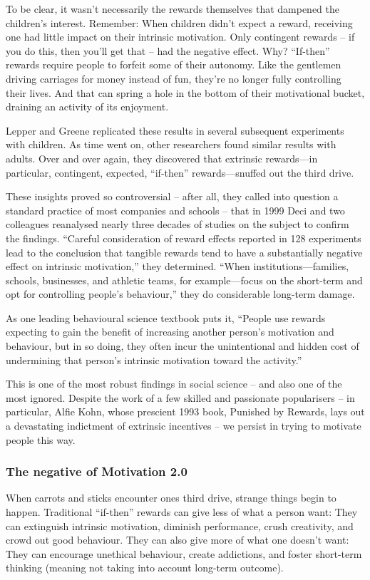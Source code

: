 To be clear, it wasn’t necessarily the rewards themselves that dampened the children’s interest. Remember: When children didn’t expect a reward, receiving one had little impact on their intrinsic motivation. Only contingent rewards -- if you do this, then you’ll get that -- had the negative effect. Why? ``If-then'' rewards require people to forfeit some of their autonomy. Like the gentlemen driving carriages for money instead of fun, they’re no longer fully controlling their lives. And that can spring a hole in the bottom of their motivational bucket, draining an activity of its enjoyment.

Lepper and Greene replicated these results in several subsequent experiments with children. As time went on, other researchers found similar results with adults. Over and over again, they discovered that extrinsic rewards—in particular, contingent, expected, ``if-then'' rewards—snuffed out the third drive.

These insights proved so controversial -- after all, they called into question a standard practice of most companies and schools -- that in 1999 Deci and two colleagues reanalysed nearly three decades of studies on the subject to confirm the findings. ``Careful consideration of reward effects reported in 128 experiments lead to the conclusion that tangible rewards tend to have a substantially negative effect on intrinsic motivation,'' they determined. ``When institutions—families, schools, businesses, and athletic teams, for example—focus on the short-term and opt for controlling people’s behaviour,'' they do considerable long-term damage.

As one leading behavioural science textbook puts it, ``People use rewards expecting to gain the benefit of increasing another person’s motivation and behaviour, but in so doing, they often incur the unintentional and hidden cost of undermining that person’s intrinsic motivation toward the activity.''

This is one of the most robust findings in social science -- and also one of the most ignored. Despite the work of a few skilled and passionate popularisers -- in particular, Alfie Kohn, whose prescient 1993 book, Punished by Rewards, lays out a devastating indictment of extrinsic incentives -- we persist in trying to motivate people this way.

\subsubsection{The negative of Motivation 2.0}
When carrots and sticks encounter ones third drive, strange things begin to happen. Traditional ``if-then'' rewards can give  less of what a person want: They can extinguish intrinsic motivation, diminish performance, crush creativity, and crowd out good behaviour. They can also give more of what one doesn’t want: They can encourage unethical behaviour, create addictions, and foster short-term thinking (meaning not taking into account long-term outcome).

